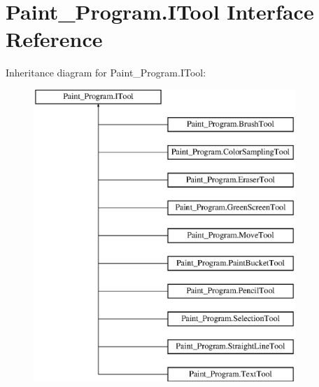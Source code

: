 \hypertarget{interface_paint___program_1_1_i_tool}{}\section{Paint\+\_\+\+Program.\+I\+Tool Interface Reference}
\label{interface_paint___program_1_1_i_tool}
Inheritance diagram for Paint\+\_\+\+Program.\+I\+Tool\+:\begin{figure}[H]
\begin{center}
\leavevmode
\includegraphics[height=11.000000cm]{interface_paint___program_1_1_i_tool}
\end{center}
\end{figure}
